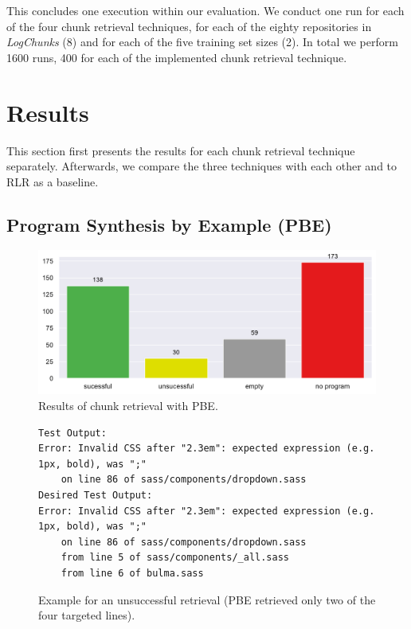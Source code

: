 This concludes one execution within our evaluation.
We conduct one run for each of the four chunk retrieval techniques,
for each of the eighty repositories in \emph{LogChunks} (8)
and for each of the five training set sizes (2).
In total we perform 1600 runs, 400 for each of the implemented chunk
retrieval
technique.

\section{Results}
This section first presents the results for each chunk retrieval
technique separately.
Afterwards, we compare the three techniques with each other and to RLR
as a baseline.

\subsection{Program Synthesis by Example (PBE)}
\label{sec:r:pbe}

\begin{figure}[tbp]
		\centering
		\includegraphics[width=\columnwidth,
		clip]{img/big-study/failure-reason-pbe.pdf}
		\caption{Results of chunk retrieval with PBE.}
		\label{fig:failure-reason-PBE}
\end{figure}

\begin{figure}[!t]
  \centering
  \begin{lstlisting}[breaklines=true]
Test Output:
Error: Invalid CSS after "2.3em": expected expression (e.g.
1px, bold), was ";"
	on line 86 of sass/components/dropdown.sass
Desired Test Output:
Error: Invalid CSS after "2.3em": expected expression (e.g.
1px, bold), was ";"
	on line 86 of sass/components/dropdown.sass
	from line 5 of sass/components/_all.sass
	from line 6 of bulma.sass
  \end{lstlisting}
  \caption{Example for an unsuccessful retrieval (PBE retrieved only
  two of the four targeted lines).}
  \label{lst:pbe-unsuccessful}
\end{figure}

